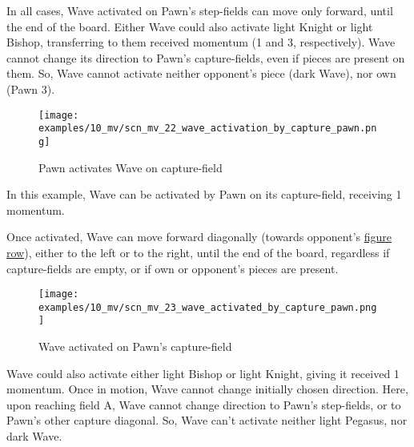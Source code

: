 In all cases, Wave activated on Pawn's step-fields can move only forward, until the end
of the board. Either Wave could also activate light Knight or light Bishop, transferring
to them received momentum (1 and 3, respectively). Wave cannot change its direction to
Pawn's capture-fields, even if pieces are present on them. So, Wave cannot activate neither
opponent's piece (dark Wave), nor own (Pawn 3).

\clearpage %

\vspace*{-2.1\baselineskip}
\noindent
\begin{figure}[!h]
\texttt{[image: examples/10\_mv/scn\_mv\_22\_wave\_activation\_by\_capture\_pawn.png]}
\caption{Pawn activates Wave on capture-field}
\label{fig:scn_mv_22_wave_activation_by_capture_pawn}
\end{figure}

In this example, Wave can be activated by Pawn on its capture-field, receiving 1 momentum.

Once activated, Wave can move forward diagonally (towards opponent's
\hyperref[sec:Terms/Figure row]{figure row}), either to the left or to the right, until the
end of the board, regardless if capture-fields are empty, or if own or opponent's pieces are
present.

\clearpage %

\vspace*{-2.1\baselineskip}
\noindent
\begin{figure}[!h]
\texttt{[image: examples/10\_mv/scn\_mv\_23\_wave\_activated\_by\_capture\_pawn.png]}
\caption{Wave activated on Pawn's capture-field}
\label{fig:scn_mv_23_wave_activated_by_capture_pawn}
\end{figure}

Wave could also activate either light Bishop or light Knight, giving it received 1 momentum.
Once in motion, Wave cannot change initially chosen direction. Here, upon reaching field A,
Wave cannot change direction to Pawn's step-fields, or to Pawn's other capture diagonal. So,
Wave can't activate neither light Pegasus, nor dark Wave.

\clearpage %

